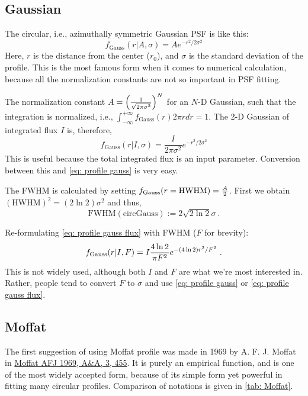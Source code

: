 \subsection{Gaussian}
The circular, i.e., azimuthally symmetric Gaussian PSF is like this:
\begin{equation}\label{eq: profile gauss}
  f_\mathrm{Gauss}(r|A, \sigma) = A e^{ -r^2 / 2\sigma^2 } 
\end{equation}
Here, $r$ is the distance from the center ($r_0$), and $\sigma$ is the standard deviation of the profile. This is the most famous form when it comes to numerical calculation, because all the normalization constants are not so important in PSF fitting.

The normalization constant $A = \qty( \frac{1}{\sqrt{2 \pi \sigma^2}} )^N$ for an $ N $-D Gaussian, such that the integration is normalized, i.e., $ \int_{-\infty}^{+\infty} f_\mathrm{Gauss}(r) 2\pi r dr = 1$. The 2-D Gaussian of integrated flux $ I $ is, therefore,
\begin{equation}\label{eq: profile gauss flux}
  f_\mathrm{Gauss}(r|I, \sigma) = \frac{I}{2 \pi \sigma^2} e^{ -r^2 / 2\sigma^2 }
\end{equation}
This is useful because the total integrated flux is an input parameter. Conversion between this and \cref{eq: profile gauss} is very easy.

The FWHM is calculated by setting $f_{\rm Gauss}(r = \mathrm{HWHM}) = \frac{A}{2}$. First we obtain $ (\mathrm{HWHM})^2 = (2 \ln 2) \sigma^2 $ and thus,
\begin{equation}\label{eq: FWHM gauss}
  \mathrm{FWHM (circ Gauss)} := 2 \sqrt{2 \ln 2} \sigma ~.
\end{equation}

Re-formulating \cref{eq: profile gauss flux} with FWHM ($ F $ for brevity):
\begin{equation}\label{eq: profile gauss fwhm}
  f_{\rm Gauss}(r|I, F) = I \frac{4\ln 2}{\pi F^2} e^{ - (4 \ln 2) r^2 / F^2 } ~.
\end{equation}
This is not widely used, although both $ I $ and $ F $ are what we're most interested in. Rather, people tend to convert $ F $ to $ \sigma $ and use \cref{eq: profile gauss} or \cref{eq: profile gauss flux}.

\subsection{Moffat}
The first suggestion of using Moffat profile was made in 1969 by A. F. J. Moffat in \href{https://ui.adsabs.harvard.edu/abs/1969A\%26A.....3..455M}{Moffat AFJ 1969, A\&A, 3, 455}. It is purely an empirical function, and is one of the most widely accepted form, because of its simple form yet powerful in fitting many circular profiles. Comparison of notations is given in \cref{tab: Moffat}.

